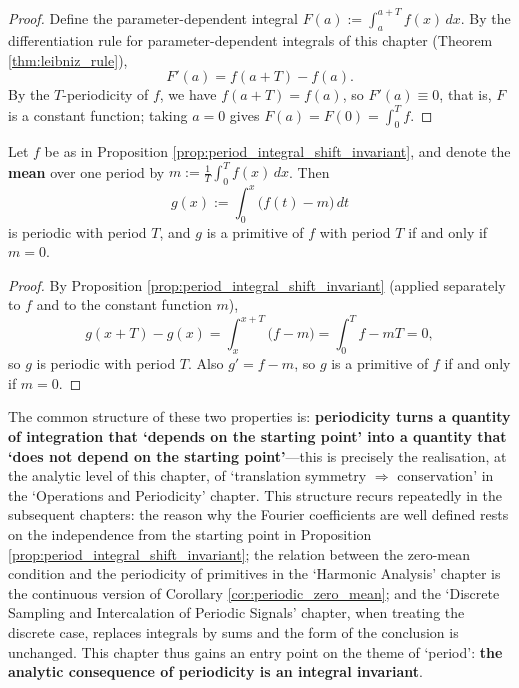 \begin{proof}
Define the parameter-dependent integral $F(a):=\int_a^{a+T}f(x)\,dx$. By the differentiation rule for parameter-dependent integrals of this chapter (Theorem \ref{thm:leibniz_rule}),
\[
F'(a)=f(a+T)-f(a).
\]
By the $T$-periodicity of $f$, we have $f(a+T)=f(a)$, so $F'(a)\equiv0$, that is, $F$ is a constant function; taking $a=0$ gives $F(a)=F(0)=\int_0^{T}f$.
\end{proof}

\begin{corollary}\label{cor:periodic_zero_mean}
Let $f$ be as in Proposition \ref{prop:period_integral_shift_invariant}, and denote the \textbf{mean} over one period by $m:=\frac1T\int_0^{T}f(x)\,dx$. Then
\[
g(x):=\int_0^{x}\bigl(f(t)-m\bigr)\,dt
\]
is periodic with period $T$, and $g$ is a primitive of $f$ with period $T$ if and only if $m=0$.
\end{corollary}

\begin{proof}
By Proposition \ref{prop:period_integral_shift_invariant} (applied separately to $f$ and to the constant function $m$),
\[
g(x+T)-g(x)=\int_x^{x+T}\bigl(f-m\bigr)=\int_0^{T}f-mT=0,
\]
so $g$ is periodic with period $T$. Also $g'=f-m$, so $g$ is a primitive of $f$ if and only if $m=0$.
\end{proof}

\begin{remark}\label{rem:ra_period_interface}
The common structure of these two properties is: \textbf{periodicity turns a quantity of integration that `depends on the starting point' into a quantity that `does not depend on the starting point'}---this is precisely the realisation, at the analytic level of this chapter, of `translation symmetry $\Rightarrow$ conservation' in the `Operations and Periodicity' chapter. This structure recurs repeatedly in the subsequent chapters: the reason why the Fourier coefficients are well defined rests on the independence from the starting point in Proposition \ref{prop:period_integral_shift_invariant}; the relation between the zero-mean condition and the periodicity of primitives in the `Harmonic Analysis' chapter is the continuous version of Corollary \ref{cor:periodic_zero_mean}; and the `Discrete Sampling and Intercalation of Periodic Signals' chapter, when treating the discrete case, replaces integrals by sums and the form of the conclusion is unchanged. This chapter thus gains an entry point on the theme of `period': \textbf{the analytic consequence of periodicity is an integral invariant}.
\end{remark}


